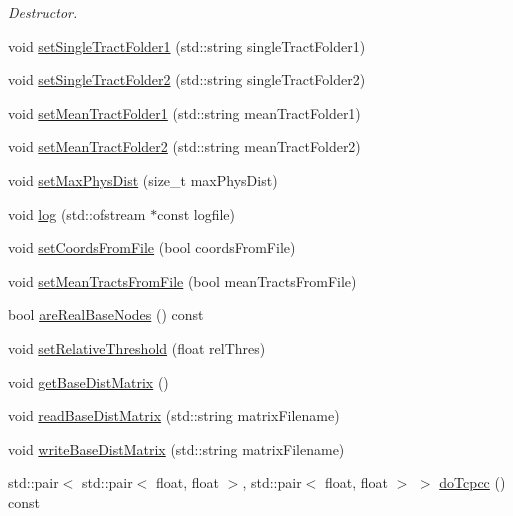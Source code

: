 \begin{DoxyCompactItemize}
\begin{DoxyCompactList}\small\item\em \-Destructor. \end{DoxyCompactList}\item 
void \hyperlink{classtreeComparer_a1ee6e259efd0135538c0f88251fbdcd0}{set\-Single\-Tract\-Folder1} (std\-::string single\-Tract\-Folder1)
\item 
void \hyperlink{classtreeComparer_a8760017af781840b4fa94fb31df6715a}{set\-Single\-Tract\-Folder2} (std\-::string single\-Tract\-Folder2)
\item 
void \hyperlink{classtreeComparer_a2c54d8ade854830bd1d50ae4f3719f59}{set\-Mean\-Tract\-Folder1} (std\-::string mean\-Tract\-Folder1)
\item 
void \hyperlink{classtreeComparer_a89839f15356d52b1a0f40160fab40f20}{set\-Mean\-Tract\-Folder2} (std\-::string mean\-Tract\-Folder2)
\item 
void \hyperlink{classtreeComparer_a0374573a06423d3e96e92f8a43ddf8a4}{set\-Max\-Phys\-Dist} (size\-\_\-t max\-Phys\-Dist)
\item 
void \hyperlink{classtreeComparer_ae4ab8def41fb390611c7f9c05058b8de}{log} (std\-::ofstream $\ast$const logfile)
\item 
void \hyperlink{classtreeComparer_aad2741eb4f6a394291c1e2a2572e0e8d}{set\-Coords\-From\-File} (bool coords\-From\-File)
\item 
void \hyperlink{classtreeComparer_a183feb12a318e7ce8059df89a91169ad}{set\-Mean\-Tracts\-From\-File} (bool mean\-Tracts\-From\-File)
\item 
bool \hyperlink{classtreeComparer_a07954cac24b564553656e9e0c238c3dc}{are\-Real\-Base\-Nodes} () const 
\item 
void \hyperlink{classtreeComparer_aa11418a78e82217f6db7e2cb4a9f59ee}{set\-Relative\-Threshold} (float rel\-Thres)
\item 
void \hyperlink{classtreeComparer_a126c2eda8a641abc1f74b2d734bbb1b7}{get\-Base\-Dist\-Matrix} ()
\item 
void \hyperlink{classtreeComparer_a9046de8cfacabfdbf380adc36bbd8b09}{read\-Base\-Dist\-Matrix} (std\-::string matrix\-Filename)
\item 
void \hyperlink{classtreeComparer_ac9de574de7fc7204f31c95f32cbf8adf}{write\-Base\-Dist\-Matrix} (std\-::string matrix\-Filename)
\item 
std\-::pair$<$ std\-::pair$<$ float, \*
float $>$, std\-::pair$<$ float, \*
float $>$ $>$ \hyperlink{classtreeComparer_ae6679002343a84e49ecbe254dbbe56ec}{do\-Tcpcc} () const 

\end{DoxyCompactItemize}
